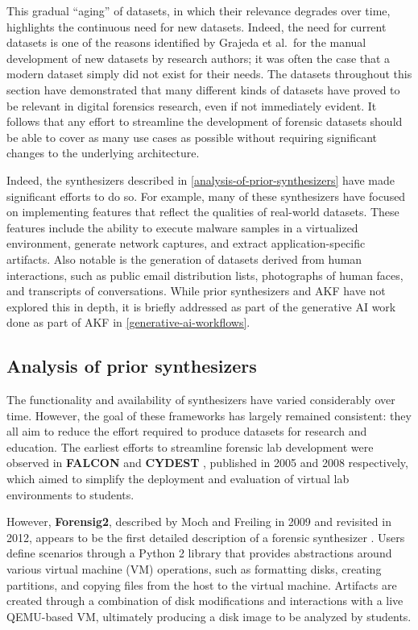 \documentclass[final,5p,times,twocolumn]{elsarticle}
\begin{document}
This gradual ``aging'' of datasets, in which their relevance degrades
over time, highlights the continuous need for new datasets. Indeed, the
need for current datasets is one of the reasons identified by Grajeda et
al.~for the manual development of new datasets by research authors; it
was often the case that a modern dataset simply did not exist for their
needs. The datasets throughout this section have demonstrated that many
different kinds of datasets have proved to be relevant in digital
forensics research, even if not immediately evident. It follows that any
effort to streamline the development of forensic datasets should be able
to cover as many use cases as possible without requiring significant
changes to the underlying architecture.

Indeed, the synthesizers described in \autoref{analysis-of-prior-synthesizers} have made significant efforts to do so. For example, many
of these synthesizers have focused on implementing features that reflect
the qualities of real-world datasets. These features include the ability
to execute malware samples in a virtualized environment, generate
network captures, and extract application-specific artifacts. Also
notable is the generation of datasets derived from human interactions,
such as public email distribution lists, photographs of human faces, and
transcripts of conversations. While prior synthesizers and AKF have not
explored this in depth, it is briefly addressed as part of the
generative AI work done as part of AKF in \autoref{generative-ai-workflows}.

\subsection{Analysis of prior
synthesizers}\label{analysis-of-prior-synthesizers}

The functionality and availability of synthesizers have varied
considerably over time. However, the goal of these frameworks has
largely remained consistent: they all aim to reduce the effort required
to produce datasets for research and education. The earliest efforts to
streamline forensic lab development were observed in \textbf{FALCON}
\cite{adelsteinAutomaticallyCreatingRealistic2005} and
\textbf{CYDEST} \cite{bruecknerAutomatedComputerForensics2008},
published in 2005 and 2008 respectively, which aimed to simplify the
deployment and evaluation of virtual lab environments to students.

However, \textbf{Forensig2}, described by Moch and Freiling in 2009 and
revisited in 2012, appears to be the first detailed description of a
forensic synthesizer
\cite{mochForensicImageGenerator2009,mochEvaluatingForensicImage2012}.
Users define scenarios through a Python 2 library that provides
abstractions around various virtual machine (VM) operations, such as
formatting disks, creating partitions, and copying files from the host
to the virtual machine. Artifacts are created through a combination of
disk modifications and interactions with a live QEMU-based VM,
ultimately producing a disk image to be analyzed by students.
\end{document}
